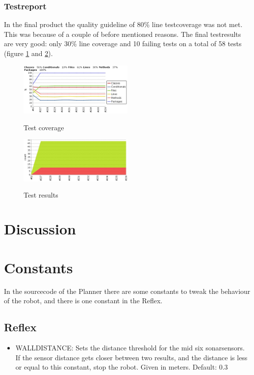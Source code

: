 \documentclass[titlepage, a4paper,10pt]{article}
\begin{document}
\subsubsection{Testreport}
In the final product the quality guideline of 80\% line testcoverage was not met. This was because of a couple of before mentioned reasons. The final testresults are very good: only 30\% line coverage and 10 failing tests on a total of 58 tests (figure \ref{fig:coverage} and \ref{fig:tests}).

\begin{figure}[h]
  \caption{Test coverage}
  \centering
    \includegraphics[width=0.5\textwidth]{coverage_graph}
  \label{fig:coverage}
\end{figure}

\begin{figure}[h]
  \caption{Test results}
  \centering
    \includegraphics[width=0.5\textwidth]{test_graph}
  \label{fig:tests}
\end{figure}

\newpage

\section{Discussion}


\newpage

\appendix
\appendixpage
\addappheadtotoc
\section{Constants}
In the sourcecode of the Planner there are some constants to tweak the behaviour of the robot, and there is one constant in the Reflex.

\subsection{Reflex}
\begin{itemize}
\item WALLDISTANCE: Sets the distance threshold for the mid six sonarsensors. If the sensor distance gets closer between two results, and the distance is less or equal to this constant, stop the robot. Given in meters. Default: 0.3
\end{itemize}
\end{document}
